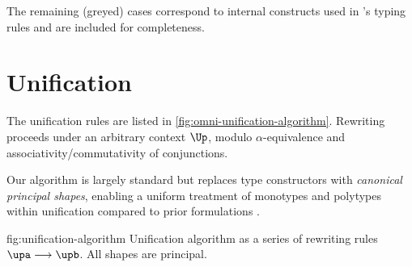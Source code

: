 \documentclass[acmsmall,screen,nonacm,review]{acmart}
\begin{document}
The remaining (greyed) cases  correspond to internal
constructs used in \OML's typing rules and are included for completeness.


\section{Unification}
\label{app:unification}

The unification rules are listed in \cref{fig:omni-unification-algorithm}.
Rewriting proceeds under an arbitrary context $\Up$, modulo $\alpha$-equivalence
and associativity/commutativity of conjunctions.

Our algorithm is largely standard \cite{Pottier-Remy/emlti} but replaces type
constructors with \emph{canonical principal shapes}, enabling a uniform
treatment of monotypes and polytypes within unification compared to
prior formulations \citep{Garrigue-Remy/poly-ml}.

%


\begin{mathparfig}[htpb!]
  {fig:unification-algorithm}
  {Unification algorithm as a series of rewriting rules
   $\upa \unif \upb$. All shapes are principal.}
   \rewrite[U-Exists]
      {(\cexists \alpha \upa) \cand \upb \\ \tv \disjoint \upb}
      {\cexists \tv {\upa \cand \upb}}

    \rewrite[U-Cycle]
      {\up \\ \cyclic \up}
      {\cfalse}

    \rewrite[U-True]
      {\up \cand \ctrue}
      {\up}

    \rewrite[U-False]
      {\Up\where\cfalse \\ \Up \neq \square}
      {\cfalse}

    \rewrite[U-Merge]
      {\cunif \tv \ueqa \cand \cunif \tv \ueqb}
      {\cunif \tv {\cunif \ueqa \ueqb}}

    \rewrite[U-Stutter]
      {\cunif \tv {\cunif \tv \ueq}}
      {\cunif \tv \ueq}

    \rewrite[U-Name]
      {\cunif {\pshapp \parens{\tys, \ti, \typs}} \ueq \\ \tv \disjoint \tys, \typs, \ueq }
      {\cexists \tv {\cunif \tv \ti \cand \cunif {\pshapp \parens{\tys, \ti, \typs}} \ueq}}

    \rewrite[U-Decomp]
      {\cunif {\pshapp \tvs} {\cunif {\pshapp \tvbs} \ueq}}
      {\cunif {\pshapp \tvs} \ueq \cand \cunif \tvs \tvbs}

    \rewrite[U-Clash]
      {\cunif {\pshapp \tvs} {\cunif {\pshapp[\shp]\tvbs } \ueq }\\
       \sh \neq \shp}
      {\cfalse}

      {\ctrue}
\end{mathparfig}
\end{document}
